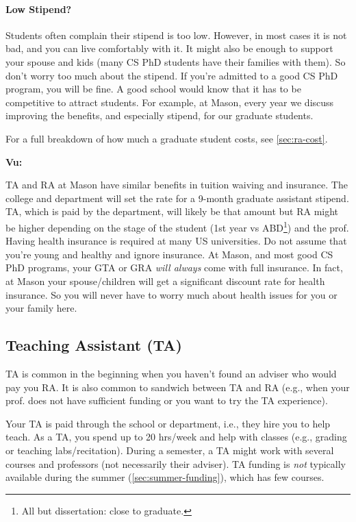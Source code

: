 \documentclass[oneside,11pt,dvipsnames]{book}
\newenvironment{commentbox}[1][]{
  \small
  \begin{mybox}
    {\small \textbf{#1}}
  }{
  \end{mybox}
}
\begin{document}
\paragraph{Low Stipend?} Students often complain their stipend is too low. However, in most cases it is not bad, and you can live comfortably with it.  It might also be enough to support your spouse and kids (many CS PhD students have their families with them). So don't worry too much about the stipend.  If you're admitted to a good CS PhD program, you will be fine. A good school would know that it has to be competitive to attract students.  For example, at Mason, every year we discuss improving the benefits, and especially stipend, for our graduate students.

For a full breakdown of how much a graduate student costs, see \autoref{sec:ra-cost}.

\begin{commentbox}[Vu:]
  TA and RA at Mason have similar benefits in tuition waiving and insurance.  The college and department will set the rate for a 9-month graduate assistant stipend.  TA, which is paid by the department, will likely be that amount but RA might be higher depending on the stage of the student (1st year vs ABD\footnote{All but dissertation: close to graduate.}) and the prof.
  \tcblower
  Having health insurance is required at many US universities.  Do not assume that you're young and healthy and ignore insurance.  At Mason, and most good CS PhD programs, your GTA or GRA \emph{will always} come with full insurance. In fact, at Mason your spouse/children will get a significant discount rate for health insurance.  So you will never have to worry much about health issues for you or your family here.
\end{commentbox}


\subsection{Teaching Assistant (TA)}\label{sec:ta}

TA is common in the beginning when you haven't found an adviser who would pay you RA. It is also common to sandwich between TA and RA (e.g., when your prof. does not have sufficient funding or you want to try the TA experience).

Your TA is paid through the school or department, i.e., they hire you to help teach.
As a TA, you spend up to 20 hrs/week and help with classes (e.g., grading or teaching labs/recitation).
During a semester, a TA might work with several courses and professors (not necessarily their adviser).  TA funding is \emph{not} typically available during the summer (\autoref{sec:summer-funding}), which has few courses.
\end{document}
